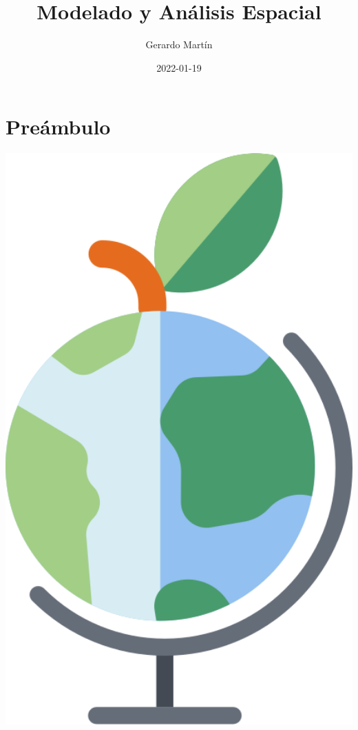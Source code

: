 \documentclass[
]{book}
\title{Modelado y Análisis Espacial}
\author{Gerardo Martín}
\date{2022-01-19}
\begin{document}
\maketitle

{
\setcounter{tocdepth}{1}
\tableofcontents
}
\hypertarget{preuxe1mbulo}{%
\chapter{Preámbulo}\label{preuxe1mbulo}}

\begin{center}\includegraphics[width=6.03in]{logo} \end{center}
\end{document}
